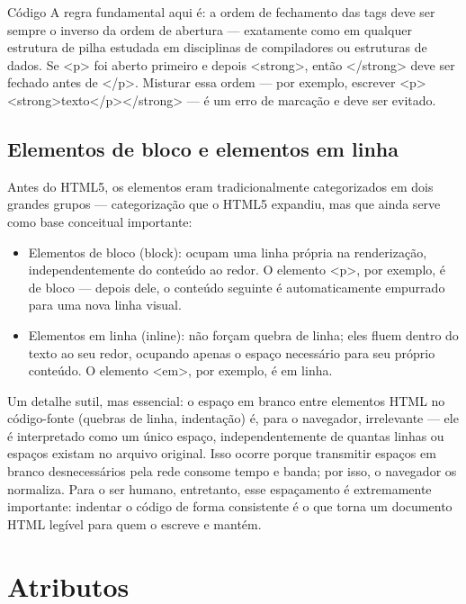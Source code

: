 \begin{codebox}{Código}
A regra fundamental aqui é: a ordem de fechamento das tags deve ser sempre o
inverso da ordem de abertura — exatamente como em qualquer estrutura de pilha
estudada em disciplinas de compiladores ou estruturas de dados. Se <p> foi aberto
primeiro e depois <strong>, então </strong> deve ser fechado antes de </p>. Misturar
essa ordem — por exemplo, escrever <p><strong>texto</p></strong> — é um erro
de marcação e deve ser evitado.
\end{codebox}

\subsection{Elementos de bloco e elementos em linha}

Antes do HTML5, os elementos eram tradicionalmente categorizados em dois grandes grupos — categorização que o HTML5 expandiu, mas que ainda serve como base conceitual importante:

\begin{itemize}
  \item Elementos de bloco (block): ocupam uma linha própria na renderização, independentemente do conteúdo ao redor. O elemento <p>, por exemplo, é de bloco — depois dele, o conteúdo seguinte é automaticamente empurrado para uma nova linha visual.
\end{itemize}

\begin{itemize}
  \item Elementos em linha (inline): não forçam quebra de linha; eles fluem dentro do texto ao seu redor, ocupando apenas o espaço necessário para seu próprio conteúdo. O elemento <em>, por exemplo, é em linha.
\end{itemize}

Um detalhe sutil, mas essencial: o espaço em branco entre elementos HTML no código-fonte (quebras de linha, indentação) é, para o navegador, irrelevante — ele é interpretado como um único espaço, independentemente de quantas linhas ou espaços existam no arquivo original. Isso ocorre porque transmitir espaços em branco desnecessários pela rede consome tempo e banda; por isso, o navegador os normaliza. Para o ser humano, entretanto, esse espaçamento é extremamente importante: indentar o código de forma consistente é o que torna um documento HTML legível para quem o escreve e mantém.

\section{Atributos}


